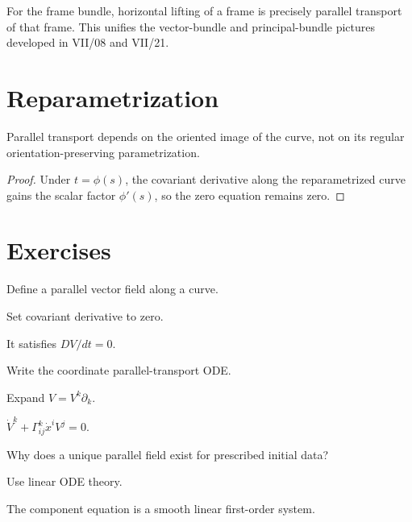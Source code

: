 \begin{remark}
For the frame bundle, horizontal lifting of a frame is precisely parallel
transport of that frame. This unifies the vector-bundle and principal-bundle
pictures developed in VII/08 and VII/21.
\end{remark}

\section{Reparametrization}

\begin{proposition}\label{prop:vii24-reparam}
Parallel transport depends on the oriented image of the curve, not on its regular
orientation-preserving parametrization.
\end{proposition}

\begin{proof}
Under \(t=\phi(s)\), the covariant derivative along the reparametrized curve gains
the scalar factor \(\phi'(s)\), so the zero equation remains zero.
\end{proof}

\section{Exercises}

\begin{exercise}\label{exr:vii24-01}
Define a parallel vector field along a curve.
\end{exercise}
\begin{hint}
Set covariant derivative to zero.
\end{hint}
\begin{solution}
It satisfies \(DV/dt=0\).
\end{solution}


\begin{exercise}\label{exr:vii24-02}
Write the coordinate parallel-transport ODE.
\end{exercise}
\begin{hint}
Expand \(V=V^k\partial_k\).
\end{hint}
\begin{solution}
\(\dot V^k+\Gamma^k_{ij}\dot x^iV^j=0\).
\end{solution}


\begin{exercise}\label{exr:vii24-03}
Why does a unique parallel field exist for prescribed initial data?
\end{exercise}
\begin{hint}
Use linear ODE theory.
\end{hint}
\begin{solution}
The component equation is a smooth linear first-order system.
\end{solution}


